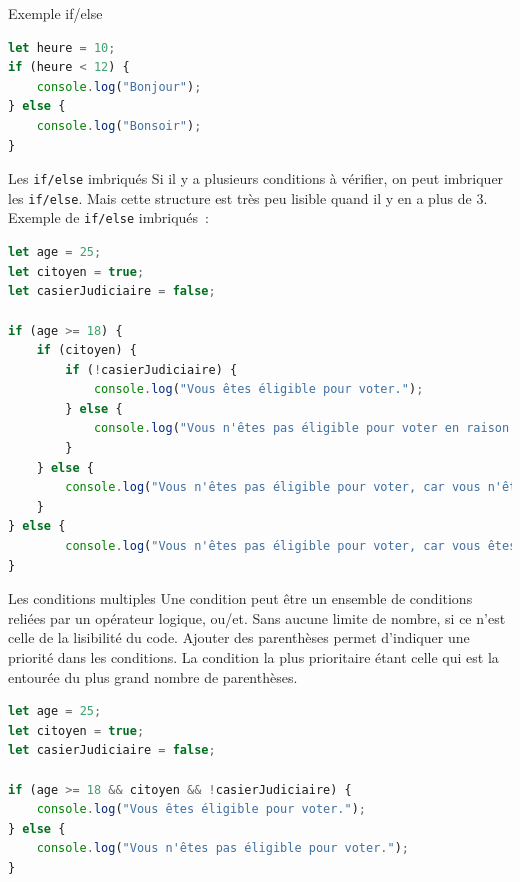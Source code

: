\documentclass{beamer}
\begin{document}
    \begin{frame}[fragile]{Exemple if/else}
        \begin{lstlisting}[language=JavaScript,title={\tiny{Script JavaScript}}]
let heure = 10;
if (heure < 12) {
    console.log("Bonjour");
} else {
    console.log("Bonsoir");
}
        \end{lstlisting}
    \end{frame}

    \begin{frame}[fragile]{Les \lstinline{if/else} imbriqués}
        Si il y a plusieurs conditions à vérifier, on peut imbriquer les \lstinline{if/else}.
        \bigbreak
        Mais cette structure est très peu lisible quand il y en a plus de 3.
        Exemple de \lstinline{if/else} imbriqués~:
        \begin{lstlisting}[language=JavaScript,title={\tiny{Script JavaScript}},basicstyle=\tiny\ttfamily]
let age = 25;
let citoyen = true;
let casierJudiciaire = false;

if (age >= 18) {
    if (citoyen) {
        if (!casierJudiciaire) {
            console.log("Vous êtes éligible pour voter.");
        } else {
            console.log("Vous n'êtes pas éligible pour voter en raison de votre casier judiciaire.");
        }
    } else {
        console.log("Vous n'êtes pas éligible pour voter, car vous n'êtes pas citoyen.");
    }
} else {
        console.log("Vous n'êtes pas éligible pour voter, car vous êtes mineur.");
}
        \end{lstlisting}
    \end{frame}

    \begin{frame}[fragile]{Les conditions multiples}
        Une condition peut être un ensemble de conditions reliées par un opérateur logique, ou/et.
        Sans aucune limite de nombre, si ce n'est celle de la lisibilité du code.
        \bigbreak
        Ajouter des parenthèses permet d'indiquer une priorité dans les conditions.
        La condition la plus prioritaire étant celle qui est la entourée du plus grand nombre de parenthèses.
        \begin{lstlisting}[language=JavaScript,title={\tiny{Script JavaScript}}]
let age = 25;
let citoyen = true;
let casierJudiciaire = false;

if (age >= 18 && citoyen && !casierJudiciaire) {
    console.log("Vous êtes éligible pour voter.");
} else {
    console.log("Vous n'êtes pas éligible pour voter.");
}
        \end{lstlisting}
    \end{frame}
\end{document}
